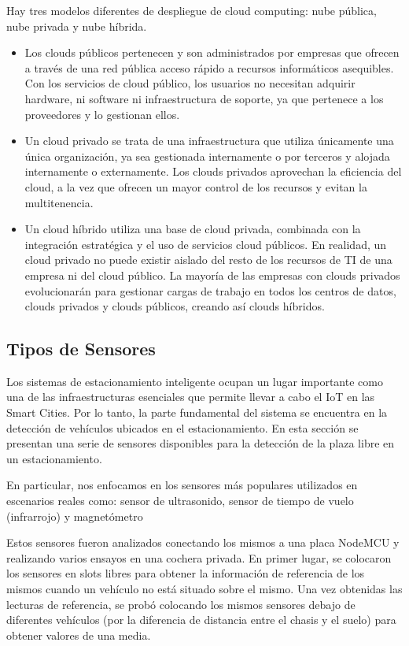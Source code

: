 Hay tres modelos diferentes de despliegue de cloud computing: nube pública, nube privada y nube híbrida.
\begin{itemize}
    \item Los clouds públicos pertenecen y son administrados por empresas que ofrecen a través de una red pública acceso rápido a recursos informáticos asequibles. Con los servicios de cloud público, los usuarios no necesitan adquirir hardware, ni software ni infraestructura de soporte, ya que pertenece a los proveedores y lo gestionan ellos.
    \item Un cloud privado se trata de una infraestructura que utiliza únicamente una única organización, ya sea gestionada internamente o por terceros y alojada internamente o externamente. Los clouds privados aprovechan la eficiencia del cloud, a la vez que ofrecen un mayor control de los recursos y evitan la multitenencia.
    \item Un cloud híbrido utiliza una base de cloud privada, combinada con la integración estratégica y el uso de servicios cloud públicos. En realidad, un cloud privado no puede existir aislado del resto de los recursos de TI de una empresa ni del cloud público. La mayoría de las empresas con clouds privados evolucionarán para gestionar cargas de trabajo en todos los centros de datos, clouds privados y clouds públicos, creando así clouds híbridos.
\end{itemize}

\subsection{Tipos de Sensores}
Los sistemas de estacionamiento inteligente  ocupan un lugar importante como una de las infraestructuras esenciales que permite llevar a cabo el IoT en las Smart Cities. Por lo tanto, la parte fundamental del sistema se encuentra en la detección de vehículos ubicados en el estacionamiento. En esta sección se presentan una serie de sensores disponibles para la detección de la plaza libre en un estacionamiento. 

En particular, nos enfocamos en los sensores más populares utilizados en escenarios reales como: sensor de ultrasonido, sensor de tiempo de vuelo (infrarrojo) y magnetómetro

Estos sensores fueron analizados conectando los mismos a una placa NodeMCU y realizando varios ensayos en una cochera privada. En primer lugar, se colocaron los sensores en slots libres para obtener la información de referencia de los mismos cuando un vehículo no está situado sobre el mismo. Una vez obtenidas las lecturas de referencia, se probó colocando los mismos sensores debajo de diferentes vehículos (por la diferencia de distancia entre el chasis y el suelo) para obtener valores de una media.

